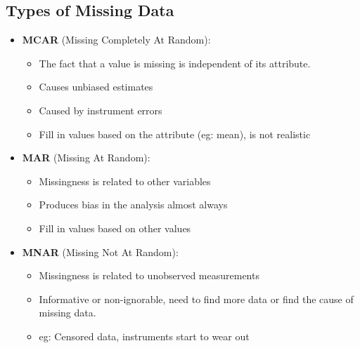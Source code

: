 \documentclass{article}
\theoremstyle{plain}
\theoremstyle{definition}
\begin{document}
\subsection{Types of Missing Data}
\begin{itemize}
    \item \textbf{MCAR} (Missing Completely At Random):
    \begin{itemize}
        \item The fact that a value is missing is independent of its attribute.
        
        \item Causes unbiased estimates
        
        \item Caused by instrument errors
        
        \item Fill in values based on the attribute (eg: mean), is not realistic
    \end{itemize}
    
    \item \textbf{MAR} (Missing At Random):
    \begin{itemize}
        \item Missingness is related to other variables
        
        \item Produces bias in the analysis almost always
        
        \item Fill in values based on other values
    \end{itemize}
    
    \item \textbf{MNAR} (Missing Not At Random):
    \begin{itemize}
        \item Missingness is related to unobserved measurements 
        
        \item Informative or non-ignorable, need to find more data or find the cause of missing data. 
        
        \item eg: Censored data, instruments start to wear out
    \end{itemize}
\end{itemize}
\end{document}
